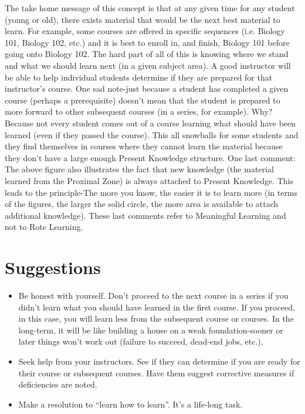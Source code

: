 The take home message of this concept is that at any given time for any student (young or old), there exists material that would be the next best material to learn. For example, some courses are offered in specific sequences (i.e. Biology 101, Biology 102, etc.) and it is best to enroll in, and finish, Biology 101 before going onto Biology 102. The hard part of all of this is knowing where we stand and what we should learn next (in a given subject area). A good instructor will be able to help individual students determine if they are prepared for that instructor's course. One sad note-just because a student has completed a given course (perhaps a prerequisite) doesn't mean that the student is prepared to more forward to other subsequent courses (in a series, for example). Why? Because not every student comes out of a course learning what should have been learned (even if they passed the course). This all snowballs for some students and they find themselves in courses where they cannot learn the material because they don't have a large enough Present Knowledge structure. One last comment: The above figure also illustrates the fact that new knowledge (the material learned from the Proximal Zone) is always attached to Present Knowledge. This leads to the principle-The more you know, the easier it is to learn more (in terms of the figures, the larger the solid circle, the more area is available to attach additional knowledge). These last comments refer to Meaningful Learning and not to Rote Learning.

\section{Suggestions}

\begin{itemize}
	\item Be honest with yourself. Don't proceed to the next course in a series if you didn't learn what you should have learned in the first course. If you proceed, in this case, you will learn less from the subsequent course or courses. In the long-term, it will be like building a house on a weak foundation-sooner or later things won't work out (failure to succeed, dead-end jobs, etc.).
	\item Seek help from your instructors. See if they can determine if you are ready for their course or subsequent courses. Have them suggest corrective measures if deficiencies are noted.
	\item Make a resolution to ``learn how to learn''. It's a life-long task. 
\end{itemize}